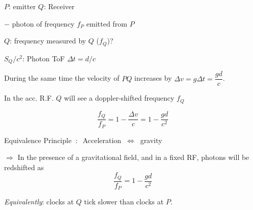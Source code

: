 \documentclass[a4paper,12pt]{article}
\begin{document}
$P$: emitter \qquad $Q$: Receiver

$-$ photon of frequency $f_P$ emitted from $P$

$Q$: frequency measured by $Q$ ($f_Q$)?

$S_Q/c^2$: Photon ToF $\Delta t=d/c$

During the same time the velocity of $PQ$ increases by $\Delta v=g\Delta t=\dfrac{gd}{c}$.

In the acc. R.F. $Q$ will see a doppler-shifted frequency $f_Q$

\[
  \frac{f_Q}{f_P}=1-\frac{\Delta v}{c}=1-\frac{gd}{c^2}
\]

\begin{center}
\large Equivalence Principle $\ :\ $ Acceleration $\ \Longleftrightarrow\ $ gravity
\end{center}

$\Longrightarrow$ In the presence of a gravitational field, and in a fixed RF, photons will be redshifted as
\[
  \frac{f_Q}{f_P}=1-\frac{gd}{c^2}
\]

\vspace{1em}
\textit{Equivalently}: clocks at $Q$ tick slower than clocks at $P$.
\end{document}
